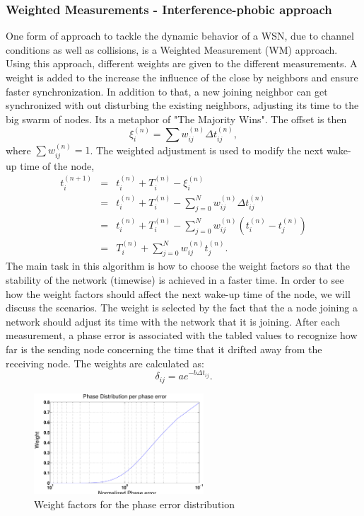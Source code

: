 \documentclass[journal]{IEEEtran}
\begin{document}
\subsubsection{\textbf{Weighted Measurements - Interference-phobic approach}}
One form of approach to tackle the dynamic behavior of a WSN, due to channel conditions as well as collisions, is a
Weighted Measurement (WM) approach. Using this approach, different
weights are given to the different measurements. A weight is added to
the increase the influence of the close by neighbors and ensure
faster synchronization. In addition to that, a new joining neighbor
can get synchronized with out disturbing the existing neighbors,
adjusting its time to the big swarm of nodes. Its a metaphor of "The
Majority Wins". \newline
The offset is then 
\begin{equation}
\xi_i^{(n)} = \sum{w_{ij}^{(n)}\Delta t_{ij}^{(n)}} ,
\end{equation}
where $\sum{w_{ij}^{(n)}= 1}$.
\newline
The weighted adjustment is used to modify the next wake-up time of
the node,
\begin{eqnarray*}
t_i^{(n+1)} &=& t_i^{(n)} + T_i^{(n)} - \xi_i^{(n)} \\ &=& t_i^{(n)}
+ T_i^{(n)} - \sum_{j=0}^N{w_{ij}^{(n)}\Delta t_{ij}^{(n)}} \\ &=&
t_i^{(n)}+ T_i^{(n)} -
\sum_{j=0}^N{w_{ij}^{(n)}(t_i^{(n)}-t_j^{(n)})} \\ &=& T_i^{(n)} + \sum_{j=0}^N{w_{ij}^{(n)}t_j^{(n)}}.
\end{eqnarray*}
\newline
The main task in this algorithm is how to choose the weight factors so that the
stability of the network (timewise) is achieved in a faster time. In
order to see how the weight factors should affect the next wake-up
time of the node, we will discuss the scenarios.
\newline
The weight is selected by the fact that the a node joining a network
should adjust its time with the network that it is joining. After
each measurement, a phase error is associated with the tabled values
to recognize how far is the sending node concerning the time that it
drifted away from the receiving node. The weights are calculated as:
\begin{equation}
\delta_{ij} = ae^{-b\Delta t_{ij}}.
\end{equation}
\begin{figure}[t]
\centering
\includegraphics[width= 2.5in]{weight}
\caption{Weight factors for the phase error distribution}
\label{weight}
\end{figure}
 
\end{document}
